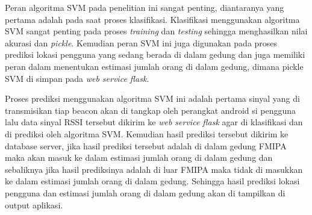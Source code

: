 \par Peran algoritma SVM pada penelitian ini sangat penting, diantaranya yang pertama adalah pada saat proses klasifikasi. Klasifikasi menggunakan algoritma SVM sangat penting pada proses \textit{training} dan \textit{testing} sehingga menghasilkan nilai akurasi dan \textit{pickle}. Kemudian peran SVM ini juga digunakan pada proses prediksi lokasi pengguna yang sedang berada di dalam gedung dan juga memiliki peran dalam menentukan estimasi jumlah orang di dalam gedung, dimana pickle SVM di simpan pada \textit{web service flask}.

\par Proses prediksi menggunakan algoritma SVM ini adalah pertama sinyal yang di transmisikan tiap beacon akan di tangkap oleh perangkat android si pengguna lalu data sinyal RSSI tersebut dikirim ke \textit{web service flask} agar di klasifikasi dan di prediksi oleh algoritma SVM. Kemudian hasil prediksi tersebut dikirim ke database server, jika hasil prediksi tersebut adalah di dalam gedung FMIPA maka akan masuk ke dalam estimasi jumlah orang di dalam gedung dan sebaliknya jika hasil prediksinya adalah di luar FMIPA maka tidak di masukkan ke dalam estimasi jumlah orang di dalam gedung. Sehingga hasil prediksi lokasi pengguna dan estimasi jumlah orang di dalam gedung akan di tampilkan di output aplikasi.


